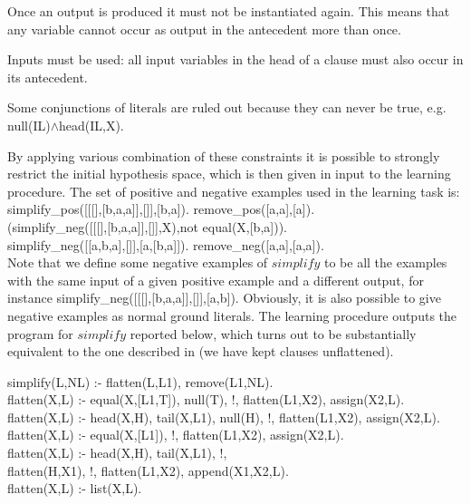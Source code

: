 \begin{itemize}
\begin{item}
Once an output is produced it must not be instantiated again. This means
that any variable cannot occur as output in the antecedent more than once.
\end{item}
\begin{item}
Inputs must be used: all input variables in the head of a clause must 
also occur in its antecedent.
\end{item}
\begin{item}
Some conjunctions of literals are ruled out because they can 
never be true, e.g.  null(IL)$\wedge$head(IL,X).
\end{item}
\end{itemize}
By applying various combination of these constraints it is possible
to strongly restrict
the initial hypothesis space, which is then 
given in input to
the learning procedure.
The set of positive and negative examples used in the learning task
is:\\
 
\noindent
simplify\_pos([[[],[b,a,a]],[]],[b,a]). remove\_pos([a,a],[a]).\\
(simplify\_neg([[[],[b,a,a]],[]],X),not equal(X,[b,a])).\\
simplify\_neg([[a,b,a],[]],[a,[b,a]]). remove\_neg([a,a],[a,a]).\\
 
\noindent
Note that we define some negative examples of $simplify$ to be all the
examples with the same input of a given positive example and 
a different output, for instance
simplify\_neg([[[],[b,a,a]],[]],[a,b]).
Obviously, it is also possible to give
negative examples as normal ground literals. 
The learning procedure outputs the program for
$simplify$ reported below, which turns out to be substantially
equivalent to the one described in \cite{prolbyex88} (we have 
kept clauses unflattened).\\
 
\small
\normalsize
 
\noindent
simplify(L,NL) :- flatten(L,L1), remove(L1,NL).\\
 
\noindent
flatten(X,L) :- equal(X,[L1,T]), null(T), !,
flatten(L1,X2), assign(X2,L).\\
flatten(X,L) :- head(X,H), tail(X,L1), null(H), !,
flatten(L1,X2), assign(X2,L).\\
flatten(X,L) :- equal(X,[L1]), !, flatten(L1,X2), assign(X2,L).\\
flatten(X,L) :- head(X,H), tail(X,L1), !,\\
\hspace*{1.1in}flatten(H,X1), !, flatten(L1,X2), append(X1,X2,L).\\
flatten(X,L) :- list(X,L).\\
 
